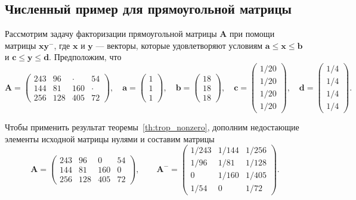 \documentclass[specialist,
               substylefile = spbu.rtx,
               subf,href,colorlinks=true, 12pt]{disser}
\theoremstyle{definition}
\begin{document}
\subsection{Численный пример для прямоугольной матрицы}\label{subsec:numeric}
Рассмотрим задачу факторизации прямоугольной матрицы $\bm{A}$ при помощи матрицы $\bm{x}\bm{y}^{-}$, где $\bm{x}$ и $\bm{y}$ --- векторы, которые удовлетворяют условиям $\bm{a}\leq \bm{x}\leq \bm{b}$ и $\bm{c}\leq \bm{y}\leq \bm{d}$. Предположим, что
\begin{equation*}
\bm{A}
=
\begin{pmatrix}
 243 & 96 & \cdot & 54
\\
 144 & 81 & 160 & \cdot
\\
 256 & 128 & 405 & 72
\end{pmatrix},
\quad
\bm{a}
=
\begin{pmatrix}
 1
\\
 1
\\
 1
\end{pmatrix},
\quad
\bm{b}
=
\begin{pmatrix}
 18
\\
 18
\\
 18
\end{pmatrix},
\quad
\bm{c}
=
\begin{pmatrix}
 1/20
\\
 1/20
\\
 1/20
\\
 1/20
\end{pmatrix},
\quad
\bm{d}
=
\begin{pmatrix}
 1/4
\\
 1/4
\\
 1/4
\\
 1/4
\end{pmatrix}.
\end{equation*}

Чтобы применить результат теоремы~\ref{th:trop_nonzero}, дополним недостающие элементы исходной матрицы нулями и составим матрицы
\begin{equation*}
\bm{A}
=
\begin{pmatrix}
 243 & 96 & 0 & 54
\\
 144 & 81 & 160 & 0
\\
 256 & 128 & 405 & 72
\end{pmatrix},
\qquad
\bm{A}^{-}
=
\begin{pmatrix}
1/243 & 1/144 & 1/256
\\
1/96 & 1/81 & 1/128
\\
0 & 1/160 & 1/405
\\
1/54 & 0 & 1/72
\end{pmatrix}.
\end{equation*}
\end{document}
